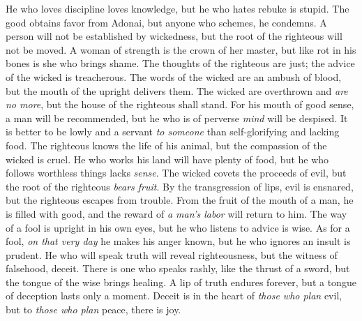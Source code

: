 \begin{biblechapter} %
\verse He who loves discipline loves knowledge, 
but he who hates rebuke is stupid.
\verse The good obtains favor from Adonai, 
but anyone who schemes, he condemns.
\verse A person will not be established by wickedness, 
but the root of the righteous will not be moved.
\verse A woman of strength is the crown of her master, 
but like rot in his bones is she who brings shame.
\verse The thoughts of the righteous are just; 
the advice of the wicked is treacherous.
\verse The words of the wicked are an ambush of blood, 
but the mouth of the upright delivers them.
\verse The wicked are overthrown and \textit{are no more}, 
but the house of the righteous shall stand.
\verse For his mouth of good sense, a man will be recommended, 
but he who is of perverse \textit{mind} will be despised.
\verse It is better to be lowly and a servant \textit{to someone} 
than self-glorifying and lacking food.
\verse The righteous knows the life of his animal, 
but the compassion of the wicked is cruel.
\verse He who works his land will have plenty of food, 
but he who follows worthless things lacks \textit{sense}.
\verse The wicked covets the proceeds of evil, 
but the root of the righteous \textit{bears fruit}.
\verse By the transgression of lips, evil is ensnared, 
but the righteous escapes from trouble.
\verse From the fruit of the mouth of a man, he is filled with good, 
and the reward of \textit{a man’s labor} will return to him.
\verse The way of a fool is upright in his own eyes, 
but he who listens to advice is wise.
\verse As for a fool, \textit{on that very day} he makes his anger known, 
but he who ignores an insult is prudent.
\verse He who will speak truth will reveal righteousness, 
but the witness of falsehood, deceit.
\verse There is one who speaks rashly, like the thrust of a sword, 
but the tongue of the wise brings healing.
\verse A lip of truth endures forever, 
but a tongue of deception lasts only a moment.
\verse Deceit is in the heart of \textit{those who plan} evil, 
but to \textit{those who plan} peace, there is joy.

\end{biblechapter}

